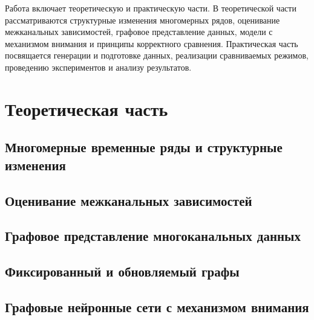 \documentclass[bachelor, och, diploma]{SCWorks}
\begin{document}
Работа включает теоретическую и практическую части. В теоретической части рассматриваются структурные изменения многомерных рядов, оценивание межканальных зависимостей, графовое представление данных, модели с механизмом внимания и принципы корректного сравнения. Практическая часть посвящается генерации и подготовке данных, реализации сравниваемых режимов, проведению экспериментов и анализу результатов.


\section{Теоретическая часть}

\subsection{Многомерные временные ряды и структурные изменения}

\subsection{Оценивание межканальных зависимостей}

\subsection{Графовое представление многоканальных данных}

\subsection{Фиксированный и обновляемый графы}

\subsection{Графовые нейронные сети с механизмом внимания}
\end{document}
